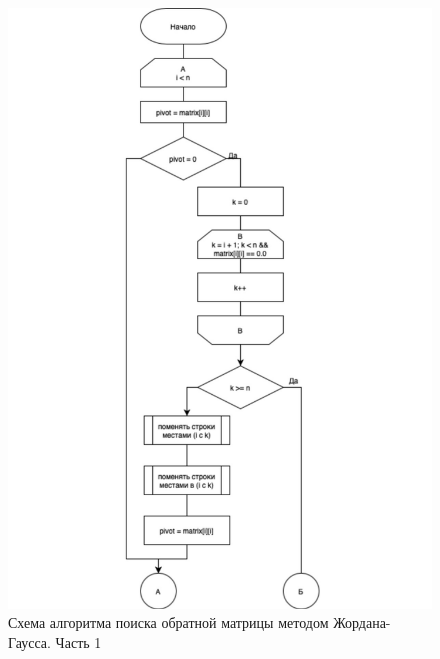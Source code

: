 \begin{figure}[h]
    \centering
    \includegraphics[width=1\linewidth]{img/gauss1.pdf}
    \caption{Схема алгоритма поиска обратной матрицы методом Жордана-Гаусса. Часть 1}
    \label{fig:gauss1}
\end{figure}

